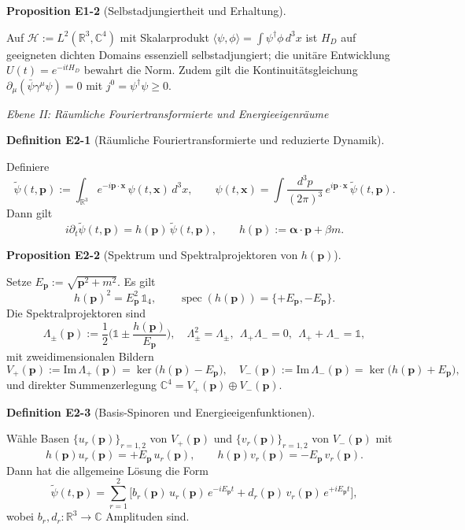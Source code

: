 \documentclass[10pt, letterpaper]{article}
\newcommand{\R}{\mathbb{R}}
\newcommand{\C}{\mathbb{C}}
\newcommand{\CustomHeading}[3]{%
  \par\medskip\noindent%
  \textbf{#1 #2} \textnormal{(#3)}.\enskip%
}
\newenvironment{DEF}[2]{\begin{unitbox}\CustomHeading{Definition}{#1}{#2}}{\end{unitbox}}
\newenvironment{PROP}[2]{\begin{unitbox}\CustomHeading{Proposition}{#1}{#2}}{\end{unitbox}}
\begin{document}
\begin{PROP}{E1-2}{Selbstadjungiertheit und Erhaltung}
Auf $\mathcal H:=L^2(\R^3,\C^4)$ mit Skalarprodukt $\langle\psi,\phi\rangle=\int \psi^\dagger\phi\,d^3x$
ist $H_D$ auf geeigneten dichten Domains essenziell selbstadjungiert; die unitäre Entwicklung $U(t)=e^{-itH_D}$
bewahrt die Norm. Zudem gilt die Kontinuitätsgleichung $\partial_\mu(\bar\psi\gamma^\mu\psi)=0$ mit $j^0=\psi^\dagger\psi\ge0$.
\end{PROP}

\emph{Ebene II: Räumliche Fouriertransformierte und Energieeigenräume}

\begin{DEF}{E2-1}{Räumliche Fouriertransformierte und reduzierte Dynamik}
Definiere
\[
\tilde\psi(t,\mathbf p):=\int_{\R^3}e^{-i\mathbf p\cdot\mathbf x}\,\psi(t,\mathbf x)\,d^3x,\qquad
\psi(t,\mathbf x)=\int\frac{d^3p}{(2\pi)^3}\,e^{i\mathbf p\cdot\mathbf x}\,\tilde\psi(t,\mathbf p).
\]
Dann gilt
\[
i\partial_t\tilde\psi(t,\mathbf p)=h(\mathbf p)\,\tilde\psi(t,\mathbf p),\qquad
h(\mathbf p):=\boldsymbol\alpha\!\cdot\!\mathbf p+\beta m.
\]
\end{DEF}

\begin{PROP}{E2-2}{Spektrum und Spektralprojektoren von $h(\mathbf p)$}
Setze $E_{\mathbf p}:=\sqrt{\mathbf p^2+m^2}$. Es gilt
\[
h(\mathbf p)^2=E_{\mathbf p}^2\,\mathbb{1}_4,\qquad
\operatorname{spec}(h(\mathbf p))=\{+E_{\mathbf p},-E_{\mathbf p}\}.
\]
Die Spektralprojektoren sind
\[
\Lambda_\pm(\mathbf p):=\frac{1}{2}\Big(\mathbb 1\pm \frac{h(\mathbf p)}{E_{\mathbf p}}\Big),
\quad
\Lambda_\pm^2=\Lambda_\pm,\ \ \Lambda_+\Lambda_-=0,\ \ \Lambda_++\Lambda_-=\mathbb 1,
\]
mit zweidimensionalen Bildern
\[
V_+(\mathbf p):=\mathrm{Im}\,\Lambda_+(\mathbf p)=\ker\big(h(\mathbf p)-E_{\mathbf p}\big),\quad
V_-(\mathbf p):=\mathrm{Im}\,\Lambda_-(\mathbf p)=\ker\big(h(\mathbf p)+E_{\mathbf p}\big),
\]
und direkter Summenzerlegung $\C^4=V_+(\mathbf p)\oplus V_-(\mathbf p)$.
\end{PROP}

\begin{DEF}{E2-3}{Basis-Spinoren und Energieeigenfunktionen}
Wähle Basen $\{u_r(\mathbf p)\}_{r=1,2}$ von $V_+(\mathbf p)$ und $\{v_r(\mathbf p)\}_{r=1,2}$ von $V_-(\mathbf p)$ mit
\[
h(\mathbf p)u_r(\mathbf p)=+E_{\mathbf p}\,u_r(\mathbf p),\qquad
h(\mathbf p)v_r(\mathbf p)=-E_{\mathbf p}\,v_r(\mathbf p).
\]
Dann hat die allgemeine Lösung die Form
\[
\tilde\psi(t,\mathbf p)=\sum_{r=1}^2\big[b_r(\mathbf p)\,u_r(\mathbf p)\,e^{-iE_{\mathbf p}t}
+d_r(\mathbf p)\,v_r(\mathbf p)\,e^{+iE_{\mathbf p}t}\big],
\]
wobei $b_r,d_r:\R^3\to\C$ Amplituden sind.
\end{DEF}
\end{document}
